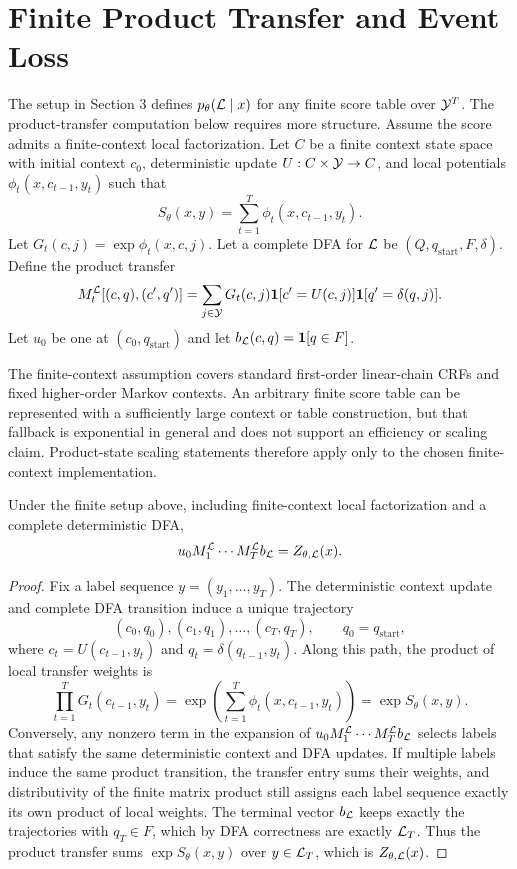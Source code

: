\section{Finite Product Transfer and Event Loss}

The setup in Section 3 defines \(p_{\theta}(\mathcal{L}\mid x)\) for any finite score
table over \(\mathcal{Y}^T\).  The product-transfer computation below requires more
structure.  Assume the score admits a finite-context local factorization.  Let \(C\) be a
finite context state space with initial context \(c_0\), deterministic update
\(U:C \times \mathcal{Y} \to C\), and local potentials
\(\phi_t(x,c_{t-1},y_t)\) such that
\[
  S_{\theta}(x,y) = \sum_{t=1}^T \phi_t(x,c_{t-1},y_t).
\]
Let \(G_t(c,j)=\exp\phi_t(x,c,j)\).  Let a complete DFA for \(\mathcal{L}\) be
\((Q,q_{\mathrm{start}},F,\delta)\).  Define the product transfer
\[
M_t^{\mathcal{L}}[(c,q),(c',q')]
= \sum_{j \in \mathcal{Y}} G_t(c,j)
  \mathbf{1}[c'=U(c,j)]\mathbf{1}[q'=\delta(q,j)] .
\]
Let \(u_0\) be one at \((c_0,q_{\mathrm{start}})\) and let
\(b_{\mathcal{L}}(c,q)=\mathbf{1}[q \in F]\).

The finite-context assumption covers standard first-order linear-chain CRFs and
fixed higher-order Markov contexts.  An arbitrary finite score table can be
represented with a sufficiently large context or table construction, but that
fallback is exponential in general and does not support an efficiency or
scaling claim.  Product-state scaling statements therefore apply only to the
chosen finite-context implementation.

\begin{theorem}
Under the finite setup above, including finite-context local factorization and
a complete deterministic DFA,
\[
  u_0 M_1^{\mathcal{L}}\cdots M_T^{\mathcal{L}} b_{\mathcal{L}}
  = Z_{\theta,\mathcal{L}}(x).
\]
\end{theorem}

\begin{proof}
Fix a label sequence \(y=(y_1,\ldots,y_T)\).  The deterministic context update
and complete DFA transition induce a unique trajectory
\[
  (c_0,q_0),(c_1,q_1),\ldots,(c_T,q_T),
  \qquad q_0=q_{\mathrm{start}},
\]
where \(c_t=U(c_{t-1},y_t)\) and \(q_t=\delta(q_{t-1},y_t)\).  Along this path,
the product of local transfer weights is
\[
  \prod_{t=1}^T G_t(c_{t-1},y_t)
  = \exp\left(\sum_{t=1}^T \phi_t(x,c_{t-1},y_t)\right)
  = \exp S_\theta(x,y).
\]
Conversely, any nonzero term in the expansion of
\(u_0M_1^{\mathcal{L}}\cdots M_T^{\mathcal{L}} b_{\mathcal{L}}\) selects labels that satisfy the same
deterministic context and DFA updates.  If multiple labels induce the same
product transition, the transfer entry sums their weights, and distributivity
of the finite matrix product still assigns each label sequence exactly its own
product of local weights.  The terminal vector \(b_{\mathcal{L}}\) keeps exactly the
trajectories with \(q_T\in F\), which by DFA correctness are exactly
\(\mathcal{L}_T\).  Thus the product transfer sums \(\exp S_\theta(x,y)\) over
\(y\in\mathcal{L}_T\), which is \(Z_{\theta,\mathcal{L}}(x)\).
\end{proof}

